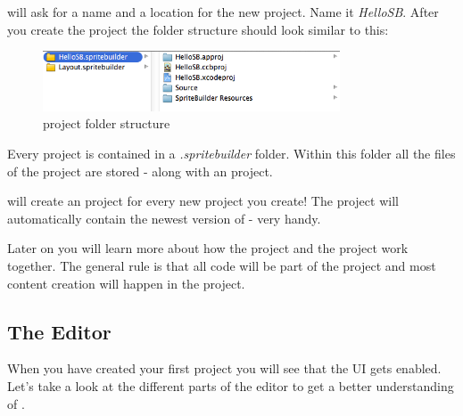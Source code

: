 \SB{} will ask for a name and a location for the new project. Name it
\textit{HelloSB}. After you create the project the folder structure should look similar to this:
\begin{figure}[H]
		\centering
		\includegraphics[width=250pt]{images/cocos2d/setup/project_structure.png}     
		\caption{\SB{} project folder structure}
\end{figure}

Every \SB{} project is contained in a \textit{.spritebuilder} folder. Within
this folder all the files of the \SB{} project are stored - along with an \xcode{}
project. 

\begin{lamp}[frametitle={\SB{} and Xcode}] 
\SB{} will create an \xcode{} project for every new project you create! The
\xcode{} project will automatically contain the newest version of \cocos{} -
very handy.
\end{lamp}

Later on you will learn more about how the \SB{} project and the \xcode{}
project work together. The general rule is that all code will be part of the
\xcode{} project and most content creation will happen in the \SB{} project.

\subsection{The Editor}
When you have created your first \SB{} project you will see that the \SB{} UI
gets enabled. Let's take a look at the different parts of the editor to get a
better understanding of \SB{}.

